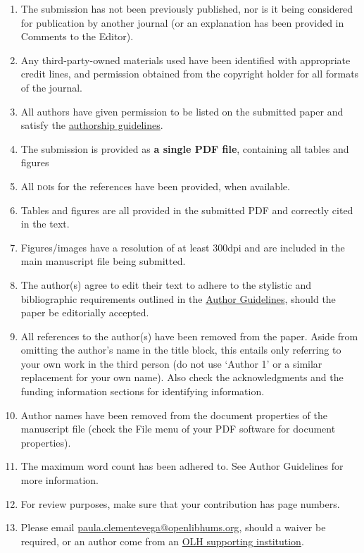 \documentclass[charis,linguex,biblatex]{glossa}
\begin{document}
\begin{enumerate}[label=\arabic*.]
\item The submission has not been previously published, nor is it being considered for publication by another journal (or an explanation has been provided in Comments to the Editor).
\item Any third-party-owned materials used have been identified with appropriate credit lines, and permission obtained from the copyright holder for all formats of the journal.
\item All authors have given permission to be listed on the submitted paper and satisfy the \href{https://www.glossa-journal.org/site/authorship/}{authorship guidelines}. 
\item The submission is provided as \textbf{a single PDF file}, containing all tables and figures
\item All \textsc{doi}s for the references have been provided, when available.
\item Tables and figures are all provided in the submitted PDF and correctly cited in the text.
\item Figures/images have a resolution of at least 300dpi and are included in the main manuscript file being submitted.
\item The author(s) agree to edit their text to adhere to the stylistic and bibliographic requirements outlined in the \href{https://www.glossa-journal.org/about/submissions#authorGuidelines}{Author Guidelines}, should the paper be editorially accepted.
\item All references to the author(s) have been removed from the paper. Aside from omitting the author’s name in the title block, this entails only referring to your own work in the third person (do not use ‘Author 1’ or a similar replacement for your own name). Also check the acknowledgments and the funding information sections for identifying information.
\item Author names have been removed from the document properties of the manuscript file (check the File menu of your PDF software for document properties).
\item The maximum word count has been adhered to. See Author Guidelines for more information.
\item For review purposes, make sure that your contribution has page numbers. 
\item Please email \href{paula.clementevega@openlibhums.org}{paula.clementevega@openlibhums.org}, should a waiver be required, or an author come from an \href{https://www.openlibhums.org/plugins/supporters/}{OLH supporting institution}.
\end{enumerate}
\end{document}
